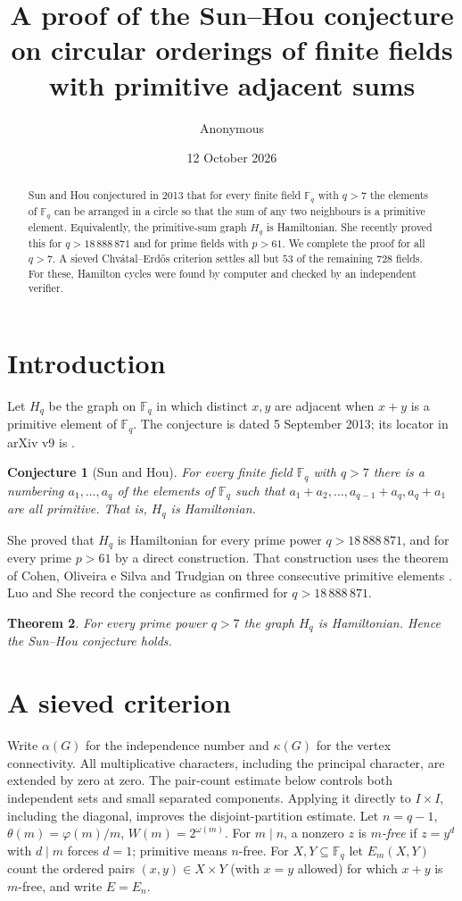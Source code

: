 \documentclass[11pt]{amsart}
\title[Primitive adjacent sums]{A proof of the Sun--Hou conjecture on circular orderings of finite fields with primitive adjacent sums}
\author{Anonymous}
\date{12 October 2026}
\newtheorem{theorem}{Theorem}
\newtheorem{conjecture}[theorem]{Conjecture}
\newcommand{\F}{\mathbb{F}}
\begin{document}
\begin{abstract}
Sun and Hou conjectured in 2013 that for every finite field $\F_q$ with $q>7$ the elements of $\F_q$ can be arranged in a circle so that the sum of any two neighbours is a primitive element. Equivalently, the primitive-sum graph $H_q$ is Hamiltonian. She recently proved this for $q>18\,888\,871$ and for prime fields with $p>61$. We complete the proof for all $q>7$. A sieved Chv\'atal--Erd\H{o}s criterion settles all but $53$ of the remaining $728$ fields. For these, Hamilton cycles were found by computer and checked by an independent verifier.
\end{abstract}
\maketitle

\section{Introduction}
Let $H_q$ be the graph on $\F_q$ in which distinct $x,y$ are adjacent when $x+y$ is a primitive element of $\F_q$.
The conjecture is dated 5 September 2013; its locator in arXiv v9 is
\cite[Conjecture 3.5(i)]{Sun}.
\begin{conjecture}[Sun and Hou]
For every finite field $\F_q$ with $q>7$ there is a numbering $a_1,\dots,a_q$ of the elements of $\F_q$ such that $a_1+a_2,\dots,a_{q-1}+a_q,a_q+a_1$ are all primitive. That is, $H_q$ is Hamiltonian.
\end{conjecture}
She \cite[Theorem 1.2(1) and Remark]{She} proved that $H_q$ is Hamiltonian for every prime power $q>18\,888\,871$, and for every prime $p>61$ by a direct construction. That construction uses the theorem of Cohen, Oliveira e Silva and Trudgian on three consecutive primitive elements \cite{COT}. Luo and She \cite{LS} record the conjecture as confirmed for $q>18\,888\,871$.

\begin{theorem}\label{thm:main}
For every prime power $q>7$ the graph $H_q$ is Hamiltonian. Hence the Sun--Hou conjecture holds.
\end{theorem}

\section{A sieved criterion}
Write $\alpha(G)$ for the independence number and $\kappa(G)$ for the vertex
connectivity. All multiplicative characters, including the principal character,
are extended by zero at zero. The pair-count estimate below controls both
independent sets and small separated components. Applying it directly to
$I\times I$, including the diagonal, improves the disjoint-partition estimate.
Let $n=q-1$, $\theta(m)=\varphi(m)/m$, $W(m)=2^{\omega(m)}$. For $m\mid n$, a nonzero $z$ is \emph{$m$-free} if $z=y^d$ with $d\mid m$ forces $d=1$; primitive means $n$-free. For $X,Y\subseteq\F_q$ let $E_m(X,Y)$ count the ordered pairs $(x,y)\in X\times Y$ (with $x=y$ allowed) for which $x+y$ is $m$-free, and write $E=E_n$.
\end{document}
